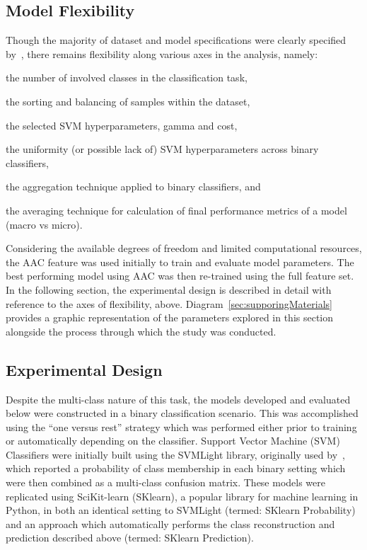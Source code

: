 \subsection{Model Flexibility}
\label{sec:modelflex}
Though the majority of dataset and model specifications were clearly specified by~\cite{mishra2014prediction}, there
remains flexibility along various axes in the analysis, namely:

\begin{enumerate}
\item the number of involved classes in the classification task,
\item the sorting and balancing of samples within the dataset,
\item the selected SVM hyperparameters, gamma and cost,
\item the uniformity (or possible lack of) SVM hyperparameters across binary classifiers,
\item the aggregation technique applied to binary classifiers, and \\
{\item the averaging technique for calculation of final performance metrics of a model (macro vs micro).}
\end{enumerate}

Considering the available degrees of freedom and limited computational resources, the AAC feature was used initially
to train and evaluate model parameters. The best performing model using AAC was then re-trained using the full feature
set. In the following section, the experimental design is described in detail with reference to the axes of flexibility,
above. Diagram~\ref{sec:supporingMaterials} provides a graphic representation of the parameters explored in this
section alongside the process through which the study was conducted.

\subsection{Experimental Design}
\label{sec:experimentaldesign}
Despite the multi-class nature of this task, the models developed and evaluated below were constructed in a binary
classification scenario. This was accomplished using the ``one versus rest'' strategy which was performed either prior
to training or automatically depending on the classifier. Support Vector Machine (SVM) Classifiers were initially built
using the SVMLight library, originally used by~\cite{mishra2014prediction}, which reported a probability of class
membership in each binary setting which were then combined as a multi-class confusion matrix. These models were
replicated using SciKit-learn (SKlearn), a popular library for machine learning in Python, in both an identical setting
to SVMLight (termed: SKlearn Probability) and an approach which automatically performs the class reconstruction and
prediction described above (termed: SKlearn Prediction).

